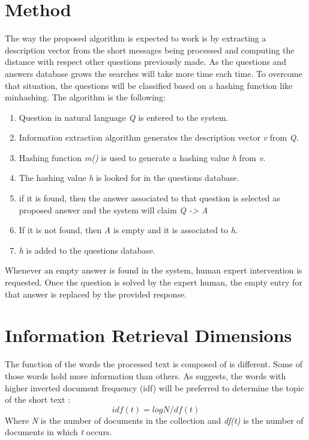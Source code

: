 \documentclass[twoside]{article}
\begin{document}
\begin{multicols}{2}
\section{Method}
The way the proposed algorithm is expected to work is by extracting a description vector from the short messages being processed and computing the distance with respect other questions previously made. As the questions and answers database grows the searches will take more time each time. To overcome that situation, the questions will be classified based on a hashing function like minhashing. The algorithm is the following: 
\begin{enumerate}
\item Question in natural language \emph{Q} is entered to the system.
\item Information extraction algorithm generates the description vector \emph{v} from \emph{Q}.
\item Hashing function \emph{m()} is used to generate a hashing value \emph{h} from \emph{v}.
\item The hashing value \emph{h} is looked for in the questions database.
\item if it is found, then the answer associated to that question is selected as proposed answer and the system will claim \emph{Q -> A}
\item If it is not found, then \emph{A} is empty and it is associated to \emph{h}.
\item \emph{h} is added to the questions database.
\end{enumerate}

Whenever an empty answer is found in the system, human expert intervention is requested. Once the question is solved by the expert human, the empty entry for that answer is replaced by the provided response.

\section{Information Retrieval Dimensions}
The function of the words the processed text is composed of is different. Some of those words hold more information than others. As \cite{Monz:2010} suggests, the words with higher inverted document frequency (idf) will be preferred to determine the topic of the short text %
:
\begin{equation}
\label{eq:idf}
idf(t) = log{N/df(t)}
\end{equation}
Where \emph{N} is the number of documents in the collection and \emph{df(t)} is the number of documents in which \emph{t} occurs.


\end{multicols}
\end{document}
